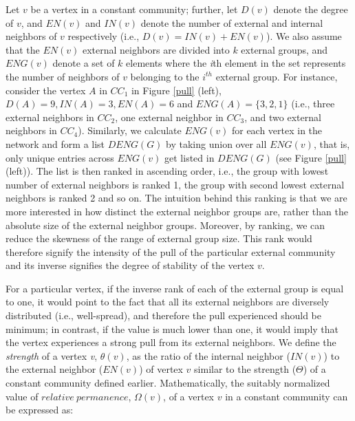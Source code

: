 Let $v$ be a vertex in a constant community; further, let $D(v)$ denote the degree of $v$, and $EN(v)$ and
$IN(v)$ denote the number of external and internal neighbors of $v$ respectively (i.e., $D(v)=IN(v)+EN(v)$). We
also assume that the $EN(v)$ external neighbors are divided into $k$ external groups, and $ENG(v)$ denote a set
of $k$ elements where the \textit{i}th element in the set represents the number of neighbors of $v$ belonging to
the $i^{th}$ external group. For instance, consider the vertex $A$ in $CC_1$ in Figure \ref{pull} (left),
$D(A)=9, IN(A)=3, EN(A)=6$ and $ENG(A)=\{3,2,1\}$ (i.e., three external neighbors in $CC_2$, one external
neighbor in $CC_3$, and two external neighbors in $CC_4$). Similarly, we calculate $ENG(v)$ for each vertex in
the network and form a list $DENG(G)$ by taking union over all $ENG(v)$, that is, only  unique entries across
$ENG(v)$ get listed in $DENG(G)$ (see Figure \ref{pull} (left)). The list is then ranked in ascending order, i.e., the group
with lowest number of external neighbors is ranked 1, the group with second lowest external neighbors is ranked 2 and so on.
The intuition behind this ranking is that we are more interested in how distinct the external neighbor groups are, rather than the
absolute size of the external neighbor groups. Moreover, by ranking, we can reduce the skewness of the range of external group size. This
rank would therefore signify the intensity of the pull of the particular external community and its inverse signifies the degree
of stability of the vertex $v$. 



For a particular vertex, if the inverse rank of each of the external group is equal to one, it would point to the fact
that all its external neighbors are diversely distributed (i.e., well-spread), and therefore the pull
experienced should be minimum; in contrast, if the value is much lower than one, it would imply that the  vertex
experiences a strong pull from its external neighbors. We define the {\it strength} of a vertex {\it v},
$\theta(v)$, as the ratio of the internal neighbor ($IN(v)$) to the external neighbor ($EN(v)$) of vertex $v$
similar to  the strength ($\Theta$) of a constant community defined earlier. Mathematically, the suitably
normalized value of $relative\ permanence$, $\Omega(v)$, of a vertex $v$ in a constant community can be expressed as:


